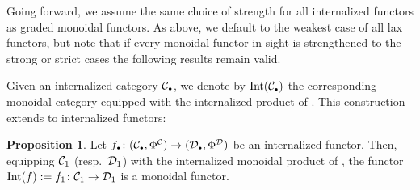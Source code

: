 \documentclass[openany, amssymb, psamsfonts]{amsart}
\theoremstyle{definition}
\newtheorem{prop}{Proposition}[section]
\numberwithin{equation}{section}
\begin{document}
Going forward, we assume the same choice of strength for all internalized functors as graded monoidal functors. As above, we default to the weakest case of all lax functors, but note that if every monoidal functor in sight is strengthened to the strong or strict cases the following results remain valid.

Given an internalized category $\C_\sbull$, we denote by $\Int(\C_\sbull)$ the corresponding monoidal category equipped with the internalized product of . This construction extends to internalized functors:

\begin{prop} \label{prop:int_of_functor_is_monoidal}
    Let $f_\sbull \colon (\C_\sbull, \Phi^\C) \to (\D_\sbull, \Phi^\D)$ be an internalized functor. Then, equipping $\mathcal{C}_1$ (resp.\ $\mathcal{D}_1$) with the internalized monoidal product of , the functor $\mathrm{Int}(f) := f_1 \colon \mathcal{C}_1 \to \mathcal{D}_1$ is a monoidal functor.
\end{prop}
\end{document}
